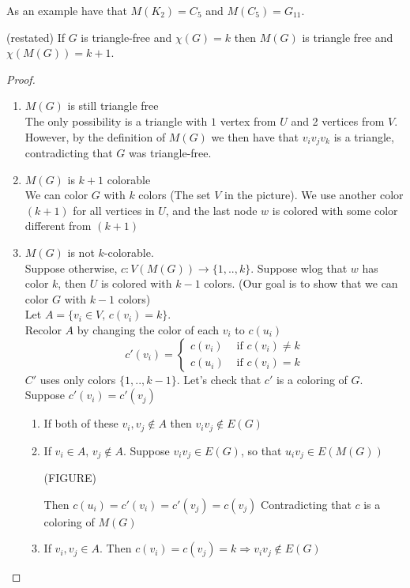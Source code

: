 As an example have that $M(K_2)=C_5$ and $M(C_5)=G_{11}$.

\begin{theorem} (restated) If $G$ is triangle-free and $\chi(G)=k$ then $M(G)$ is triangle free and $\chi(M(G))=k+1$.
\end {theorem}
\begin{proof}
\begin{enumerate}
	\item $M(G)$ is still triangle free \\
	The only possibility is a triangle with $1$ vertex from $U$ and 2 vertices from $V$. However, by the definition of $M(G)$ we then have that $v_iv_jv_k$ is a triangle, contradicting that $G$ was triangle-free.
	\item $M(G)$ is $k+1$ colorable \\
	We can color $G$ with $k$ colors (The set $V$ in the picture). We use another color $(k+1)$ for all vertices in $U$, and the last node $w$ is colored with some color different from $(k+1)$ 
	\item $M(G)$ is not $k$-colorable. \\
	Suppose otherwise, $c:V(M(G)) \rightarrow \{1,..,k\}$. Suppose wlog that $w$ has color $k$, then $U$ is colored with $k-1$ colors. (Our goal is to show that we can color $G$ with $k-1$ colors) \\
	Let $A= \{v_i \in V, \, c(v_i)=k\}$. \\
	Recolor $A$ by changing the color of each $v_i$ to $c(u_i)$ \\
	$$
	c'(v_i)=\left\{ \begin{array}{rl}
c(v_i) &\mbox{ if $c(v_i)\neq k$} \\
c(u_i) &\mbox{ if $c(v_i)=k$}
\end{array} \right.
$$
$C'$ uses only colors $ \{1,..,k-1\} $. Let's check that $c'$ is a coloring of $G$. Suppose $c'(v_i)=c'(v_j)$ 
\begin{enumerate}
	\item If both of these $v_i,v_j \notin A$ then $v_iv_j \notin E(G)$  
	\item If $v_i \in A,\, v_j \notin A$. Suppose $v_iv_j \in E(G)$, so that $u_iv_j \in E(M(G))$

(FIGURE)

Then $c(u_i)=c'(v_i)=c'(v_j)=c(v_j)$ Contradicting that $c$ is a coloring of $M(G)$
	\item If $v_i,v_j \in A$. Then $c(v_i)=c(v_j)=k \Rightarrow v_iv_j \notin E(G)$
\end{enumerate}
\end{enumerate}
\end{proof}

